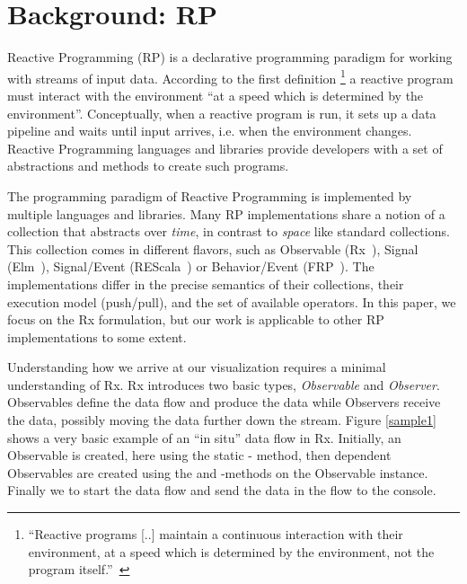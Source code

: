 \section{Background:  RP}%
\label{background}%
\label{nutshell}

Reactive Programming (RP) is a declarative programming paradigm for
working with streams of input data.  According to the first definition%
\footnote{ ``Reactive programs [..] maintain a continuous interaction
with their environment, at a speed which is determined by the
environment, not the program itself.''~\cite{berry1989real} } a reactive
program must interact with the environment ``at a speed which is
determined by the environment''.  Conceptually, when a reactive program
is run, it sets up a data pipeline and waits until input arrives, i.e.
when the environment changes.  Reactive Programming languages and
libraries provide developers with a set of abstractions and methods to
create such programs.

The programming paradigm of Reactive Programming is implemented by
multiple languages and libraries.  Many RP implementations share a
notion of a collection that abstracts over \emph{time}, in contrast to
\emph{space} like standard collections.  This collection comes in
different flavors, such as Observable (Rx~\cite{meijer2010subject}),
Signal (Elm~\cite{czaplicki2012elm}), Signal/Event (REScala~\cite{salvaneschi2014rescala})
or Behavior/Event (FRP~\cite {elliott1997functional}).  The
implementations differ in the precise semantics of their collections,
their execution model (push/pull), and the set of available operators.
In this paper, we focus on the Rx formulation, but our work is
applicable to other RP implementations to some extent.

Understanding how we arrive at our visualization requires a minimal
understanding of Rx.  Rx introduces two basic types, \emph{Observable}
and \emph{Observer}.  Observables define the data flow and produce the
data while Observers receive the data, possibly moving the data further
down the stream.  Figure%
\ref{sample1} shows a very basic example of an ``in situ'' data flow in
Rx.  Initially, an Observable is created, here using the static -%
method, then dependent Observables are created using the  and
-methods on the Observable instance.  Finally we 
to start the data flow and send the data in the flow to the console.

